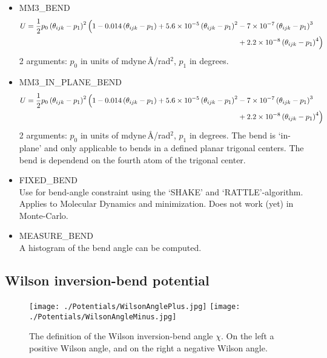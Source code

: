 \begin{itemize}
  \item{MM3\_BEND}
  \begin{equation}
  \begin{split}
  U=\frac{1}{2}p_0 \left(\theta_{ijk}-p_1\right)^2\Bigl(1-0.014\left(\theta_{ijk}-p_1\right)+
   5.6\times10^{-5}\left(\theta_{ijk}-p_1\right)^2&-7\times10^{-7}\left(\theta_{ijk}-p_1\right)^3\\
   &+2.2\times10^{-8}\left(\theta_{ijk}-p_1\right)^4
   \Bigr)
  \end{split}
  \end{equation}
  2 arguments: $p_0$ in units of mdyne\,\AA/rad$^2$, $p_1$ in degrees.
  \item{MM3\_IN\_PLANE\_BEND}
  \begin{equation}
  \begin{split}
  U=\frac{1}{2}p_0 \left(\theta_{ijk}-p_1\right)^2\Bigl(1-0.014\left(\theta_{ijk}-p_1\right)+
   5.6\times10^{-5}\left(\theta_{ijk}-p_1\right)^2&-7\times10^{-7}\left(\theta_{ijk}-p_1\right)^3\\
   &+2.2\times10^{-8}\left(\theta_{ijk}-p_1\right)^4
   \Bigr)
  \end{split}
  \end{equation}
  2 arguments: $p_0$ in units of mdyne\,\AA/rad$^2$, $p_1$ in degrees. The bend is `in-plane' and only applicable to bends in a defined planar trigonal centers.
  The bend is dependend on the fourth atom of the trigonal center.

  \item{FIXED\_BEND}\\
   Use for bend-angle constraint using the `SHAKE' and `RATTLE'-algorithm. Applies to Molecular Dynamics and minimization.
   Does not work (yet) in Monte-Carlo.

  \item{MEASURE\_BEND}\\
  A histogram of the bend angle can be computed.

\end{itemize}

\subsection{Wilson inversion-bend potential}

\begin{figure}[t]
  \centering
  \texttt{[image: ./Potentials/WilsonAnglePlus.jpg]}
  \texttt{[image: ./Potentials/WilsonAngleMinus.jpg]}
  \caption{The definition of the Wilson inversion-bend angle $\chi$.
  On the left a positive Wilson angle, and on the right a negative Wilson angle.}
  \label{Fig: Wilson definition}
\end{figure}

